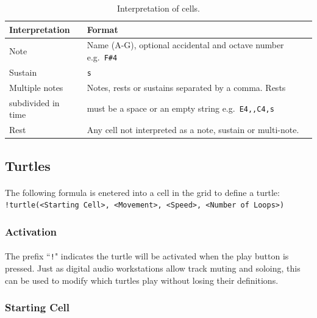 \begin{table}[htb]
\centering
\vspace{1pt}
\begin{tabular}{|l|l|} \hline
\textbf{Interpretation}&\textbf{Format}\\ \hline
Note& Name (A-G), optional accidental and octave number e.g.~\texttt{F\#4}\\ \hline
Sustain& \texttt{s}\\ \hline
Multiple notes& Notes, rests or sustains separated by a comma. Rests \\
subdivided in time& must be a space or an empty string e.g.~\texttt{E4,,C4,s}\\ \hline
Rest& Any cell not interpreted as a note, sustain or multi-note. \\ \hline
\end{tabular}
\caption{Interpretation of cells.\label{tab:cells}}
\end{table}

\subsection{Turtles}

\paragraph{} The following formula is enetered into a cell in the grid to define a turtle:\\
\texttt{!turtle(<Starting Cell>, <Movement>, <Speed>, <Number of Loops>)}

\vspace{-5pt}
\subsubsection{Activation}

\paragraph{} The prefix ``\texttt{!}" indicates the turtle will be activated when the play button is pressed. Just as digital audio workstations allow track muting and soloing, this can be used to modify which turtles play without losing their definitions.

\vspace{-5pt}
\subsubsection{Starting Cell}

